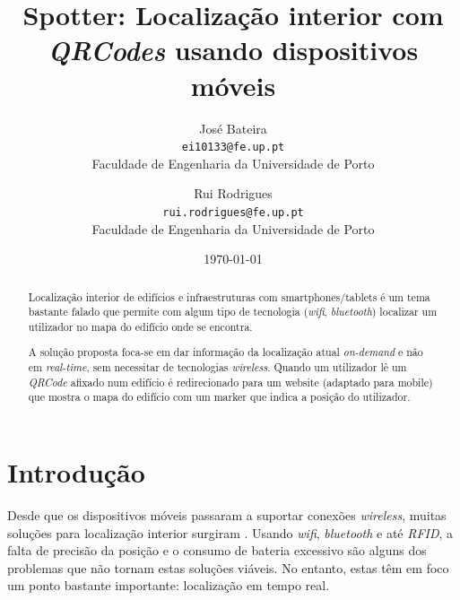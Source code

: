 \documentclass[twocolumn,twoside,11pt]{article}
\title{\vspace{-15mm}\fontsize{24pt}{10pt}\selectfont\textbf{
  Spotter: Localização interior com \emph{QRCodes} usando dispositivos móveis
}}
\author{José Bateira\\
\small \texttt{ei10133@fe.up.pt}\\
\small Faculdade de Engenharia da Universidade de Porto
\and
Rui Rodrigues\\
\small \texttt{rui.rodrigues@fe.up.pt} \\
\small Faculdade de Engenharia da Universidade de Porto
}
\date{\today}
\newcommand{\qrcode}{\emph{QRCode}}
\begin{document}
\maketitle


\begin{abstract}
Localização interior de edifícios e infraestruturas com smartphones/tablets é um tema bastante falado que permite com algum tipo de tecnologia (\emph{wifi}, \emph{bluetooth}) localizar um utilizador no mapa do edifício onde se encontra.

A solução proposta foca-se em dar informação da localização atual \emph{on-demand} e não em \emph{real-time}, sem necessitar de tecnologias \emph{wireless}.
Quando um utilizador lê um \qrcode{} afixado num edifício é redirecionado para um website (adaptado para mobile) que mostra o mapa do edifício com um marker que indica a posição do utilizador.

\end{abstract}


\section{Introdução}\label{sec:intro}

  Desde que os dispositivos móveis passaram a suportar conexões \emph{wireless}, muitas soluções para localização interior surgiram \cite{Liu2007} \cite{Koyuncu2010}.
  Usando \emph{wifi}, \emph{bluetooth} e até \emph{RFID}, a falta de precisão da posição e o consumo de bateria excessivo são alguns dos problemas que não tornam estas soluções viáveis.
  No entanto, estas têm em foco um ponto bastante importante: localização em tempo real.
\end{document}
